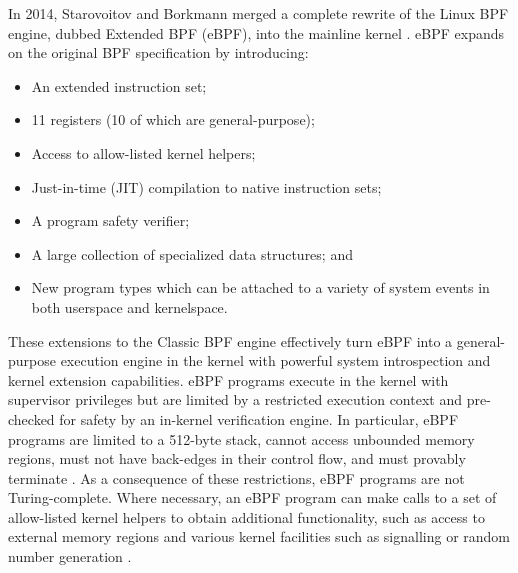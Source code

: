 In 2014, Starovoitov and Borkmann merged a complete rewrite of the Linux BPF engine, dubbed Extended BPF (eBPF), into the mainline kernel \cite{starovoitov2014_ebpf}. eBPF expands on the original BPF specification by introducing:
\begin{itemize}
  \item An extended instruction set;
  \item 11 registers (10 of which are general-purpose);
  \item Access to allow-listed kernel helpers;
  \item Just-in-time (JIT) compilation to native instruction sets;
  \item A program safety verifier;
  \item A large collection of specialized data structures; and
  \item New program types which can be attached to a variety of system events in both userspace and kernelspace.
\end{itemize}
These extensions to the Classic BPF engine effectively turn eBPF into a general-purpose execution engine in the kernel with powerful system introspection and kernel extension capabilities. eBPF programs execute in the kernel with supervisor privileges but are limited by a restricted execution context and pre-checked for safety by an in-kernel verification engine. In particular, eBPF programs are limited to a 512-byte stack, cannot access unbounded memory regions, must not have back-edges in their control flow, and must provably terminate \cite{gregg2019_bpf}. As a consequence of these restrictions, eBPF programs are not Turing-complete. Where necessary, an eBPF program can make calls to a set of allow-listed kernel helpers to obtain additional functionality, such as access to external memory regions and various kernel facilities such as signalling or random number generation \cite{gregg2019_bpf}.

